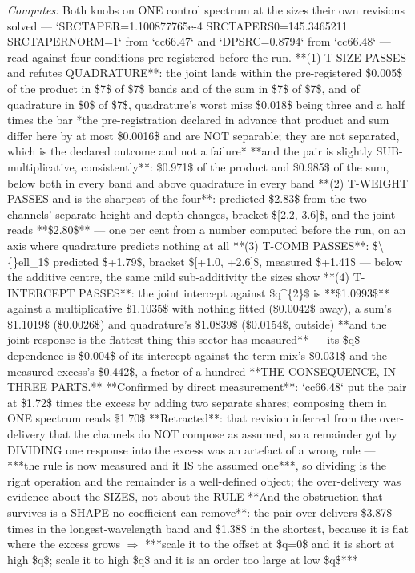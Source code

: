 \begin{description}
\emph{Computes:} Both knobs on ONE control spectrum at the sizes their own revisions solved --- `SRCTAPER=1.100877765e-4 SRCTAPERS0=145.3465211 SRCTAPERNORM=1` from `cc66.47` and `DPSRC=0.8794` from `cc66.48` --- read against four conditions pre-registered before the run.  **(1) T-SIZE PASSES and refutes QUADRATURE**: the joint lands within the pre-registered \$0.005\$ of the product in \$7\$ of \$7\$ bands and of the sum in \$7\$ of \$7\$, and of quadrature in \$0\$ of \$7\$, quadrature's worst miss \$0.018\$ being three and a half times the bar  *the pre-registration declared in advance that product and sum differ here by at most \$0.0016\$ and are NOT separable; they are not separated, which is the declared outcome and not a failure*   **and the pair is slightly SUB-multiplicative, consistently**: \$0.971\$ of the product and \$0.985\$ of the sum, below both in every band and above quadrature in every band  **(2) T-WEIGHT PASSES and is the sharpest of the four**: predicted \$2.83\$ from the two channels' separate height and depth changes, bracket \$[2.2, 3.6]\$, and the joint reads **\$2.80\$** --- one per cent from a number computed before the run, on an axis where quadrature predicts nothing at all  **(3) T-COMB PASSES**: \$\textbackslash\{\}ell\_1\$ predicted \$+1.79\$, bracket \$[+1.0, +2.6]\$, measured \$+1.41\$ --- below the additive centre, the same mild sub-additivity the sizes show  **(4) T-INTERCEPT PASSES**: the joint intercept against \$q\textasciicircum{}\{2\}\$ is **\$1.0993\$** against a multiplicative \$1.1035\$ with nothing fitted (\$0.0042\$ away), a sum's \$1.1019\$ (\$0.0026\$) and quadrature's \$1.0839\$ (\$0.0154\$, outside)   **and the joint response is the flattest thing this sector has measured** --- its \$q\$-dependence is \$0.004\$ of its intercept against the term mix's \$0.031\$ and the measured excess's \$0.442\$, a factor of a hundred   **THE CONSEQUENCE, IN THREE PARTS.**  **Confirmed by direct measurement**: `cc66.48` put the pair at \$1.72\$ times the excess by adding two separate shares; composing them in ONE spectrum reads \$1.70\$   **Retracted**: that revision inferred from the over-delivery that the channels do NOT compose as assumed, so a remainder got by DIVIDING one response into the excess was an artefact of a wrong rule --- ***the rule is now measured and it IS the assumed one***, so dividing is the right operation and the remainder is a well-defined object; the over-delivery was evidence about the SIZES, not about the RULE   **And the obstruction that survives is a SHAPE no coefficient can remove**: the pair over-delivers \$3.87\$ times in the longest-wavelength band and \$1.38\$ in the shortest, because it is flat where the excess grows \ensuremath{\Rightarrow} ***scale it to the offset at \$q=0\$ and it is short at high \$q\$; scale it to high \$q\$ and it is an order too large at low \$q\$***

\end{description}

